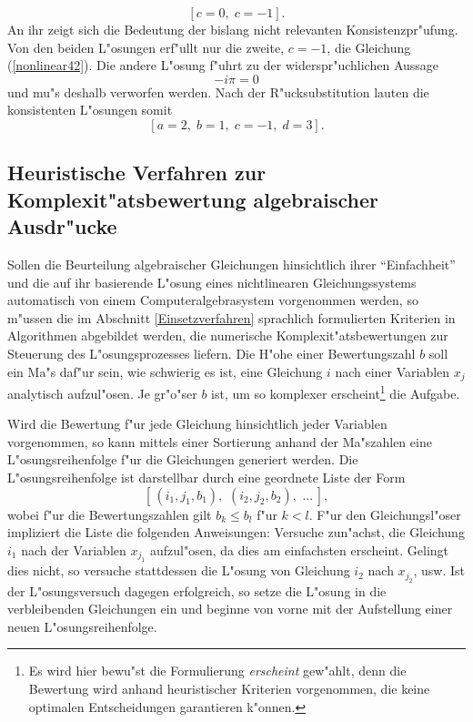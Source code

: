 \begin{equation}
\left[ c = 0, \; c = -1 \right].
\end{equation}
An ihr zeigt sich die Bedeutung der bislang nicht relevanten
Konsistenzpr"ufung. Von den beiden L"osungen erf"ullt nur die zweite, $c=-1$,
die Gleichung (\ref{nonlinear42}). Die andere L"osung f"uhrt zu der
widerspr"uchlichen Aussage
\begin{equation}
- i \pi = 0
\end{equation}
und mu"s deshalb verworfen werden. Nach der R"ucksubstitution lauten die
konsistenten L"osungen somit
\begin{equation}
\left[ a = 2, \; b = 1, \; c = -1, \; d = 3 \right].
\end{equation}

\subsection[Heuristische Verfahren zur Komplexit"atsbewertung
algebraischer Ausdr"ucke]{\label{KomplBewertung}Heuristische Verfahren zur
Komplexit"atsbewertung algebraischer\\Ausdr"ucke}

Sollen die Beurteilung algebraischer Gleichungen hinsichtlich ihrer 
``Einfachheit'' und die auf ihr basierende L"osung eines nichtlinearen 
Gleichungssystems automatisch von einem Computer\-algebrasystem
vorgenommen werden, so m"ussen die im Abschnitt \ref{Einsetzverfahren}
sprachlich formulierten Kriterien in Algorithmen abgebildet werden, die
numerische Komplexit"atsbewertungen zur Steuerung des L"osungsprozesses
liefern. Die H"ohe einer Bewertungszahl $b$ soll ein Ma"s daf"ur sein,
wie schwierig es ist, eine Gleichung $i$ nach einer Variablen $x_j$
analytisch aufzul"osen. Je gr"o"ser $b$ ist, um so komplexer
erscheint\footnote{Es wird hier bewu"st die Formulierung {\em erscheint}
gew"ahlt, denn die Bewertung wird anhand heuristischer Kriterien 
vorgenommen, die keine optimalen Entscheidungen garantieren k"onnen.}
die Aufgabe. 

Wird die Bewertung f"ur jede Gleichung hinsichtlich jeder Variablen
vorgenommen, so kann mittels einer Sortierung anhand der Ma"szahlen
eine L"osungsreihenfolge f"ur die Gleichungen generiert werden. Die
L"osungsreihenfolge ist darstellbar durch eine geordnete Liste der Form
\begin{displaymath}
\left[ \, (i_1, j_1, b_1), \,\, (i_2, j_2, b_2), \,\, \ldots \, \right],
\end{displaymath}
wobei f"ur die Bewertungszahlen gilt $b_k \leq b_l$ f"ur $k < l$. F"ur
den Gleichungsl"oser impliziert die Liste die folgenden Anweisungen:
Versuche zun"achst, die Gleichung $i_1$ nach der Variablen $x_{j_1}$ 
aufzul"osen, da dies am einfachsten erscheint. Gelingt dies nicht, so 
versuche stattdessen die L"osung von Gleichung $i_2$ nach $x_{j_2}$,
usw. Ist der L"osungsversuch dagegen erfolgreich, so setze die L"osung
in die verbleibenden Gleichungen ein und beginne von vorne mit der
Aufstellung einer neuen L"osungsreihenfolge.

